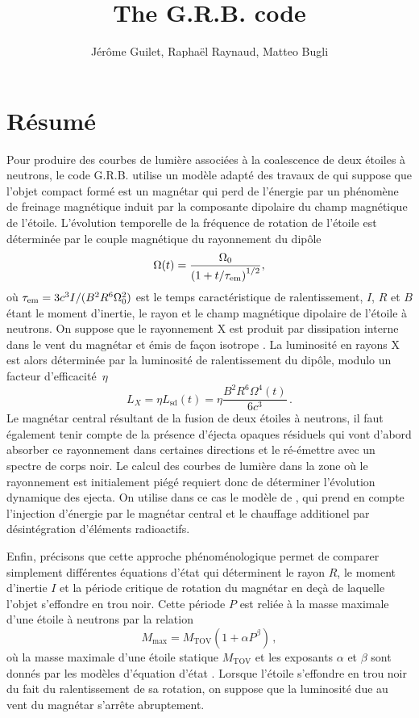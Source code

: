 \documentclass[11pt]{article} %
\title{The G.R.B. code}
\author{J\'er\^ome Guilet, Rapha\"el Raynaud, Matteo Bugli}
\newcommand{\tx}[1]{\textrm{#1}}
\begin{document}
\maketitle

\section{Résumé}
Pour produire des courbes de lumière associées à la coalescence de
deux étoiles à neutrons, le code G.R.B.  utilise un modèle adapté des
travaux de \citet{sun2017} qui suppose que l'objet compact formé est
un magnétar qui perd de l'énergie par un phénomène de freinage
magnétique induit par la composante dipolaire du champ magnétique de
l'étoile. L'évolution temporelle de la fréquence de rotation de
l'étoile est déterminée par le couple magnétique du rayonnement du
dipôle
\begin{equation}
\Omega(t) = \frac{\Omega_0}{\left(1 + t/\tau_{\rm em}\right)^{1/2}},
\end{equation}
où $\tau_{\rm em} = 3c^3 I/(B^2 R^6 \Omega_0^2) $ est le temps
caractéristique de ralentissement, $I$, $R$ et $B$ étant le moment
d'inertie, le rayon et le champ magnétique dipolaire de l'étoile à
neutrons. On suppose que le rayonnement X est produit par dissipation
interne dans le vent du magnétar et émis de façon isotrope
\citep{zhang2013}. La luminosité en rayons X est alors déterminée par
la luminosité de ralentissement du dipôle, modulo un facteur
d'efficacité~$\eta$
\begin{equation}
  L_X = \eta L_\tx{sd}(t) = \eta \frac{B^2 R^6 \Omega^4(t)}{6 c^3}
  \,.
\end{equation}
Le magnétar central résultant de la fusion de deux étoiles à neutrons,
il faut également tenir compte de la présence d'éjecta opaques
résiduels qui vont d'abord absorber ce rayonnement dans certaines
directions et le ré-émettre avec un spectre de corps noir. Le calcul
des courbes de lumière dans la zone où le rayonnement est initialement
piégé requiert donc de déterminer l'évolution dynamique des ejecta. On
utilise dans ce cas le modèle de \citet{yu2013}, qui prend en compte
l'injection d'énergie par le magnétar central et le chauffage
additionel par désintégration d'éléments radioactifs.

Enfin, précisons que cette approche phénoménologique permet de
comparer simplement différentes équations d'état qui déterminent le
rayon $R$, le moment d'inertie $I$ et la période critique de rotation
du magnétar en deçà de laquelle l'objet s'effondre en trou noir. Cette
période $P$ est reliée à la masse maximale d'une étoile à neutrons par
la relation \citep{lasky2014}
\begin{equation}
  M_\tx{max} = M_\tx{TOV} (1+ \alpha P^\beta)
  \,,
\end{equation}
où la masse maximale d'une étoile statique $M_\text{TOV}$ et les
exposants $\alpha$ et $\beta$ sont donnés par les modèles d'équation
d'état \citep{ai2018}. Lorsque l'étoile s'effondre en trou noir du
fait du ralentissement de sa rotation, on suppose que la luminosité
due au vent du magnétar s'arrête abruptement.
\end{document}
